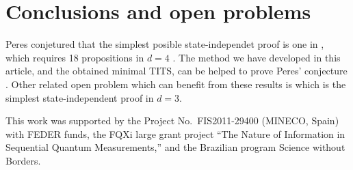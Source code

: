 \documentclass[%
  twocolumn,
 showpacs,
 showkeys,
 preprintnumbers,
 amsmath,amssymb,
 aps,
  pra,
  longbibliography,
 floatfix,
 ]{revtex4-1}
\begin{document}

\section{Conclusions and open problems}

Peres conjetured that the simplest posible state-independet proof is one in \cite{code17}, which requires 18 propositions in $d=4$ \cite{code19}. The method we have developed in this article, and the obtained minimal TITS, can be helped to prove Peres' conjecture \cite{code20}. Other related open problem which can benefit from these results is which is the simplest state-independent proof in $d=3$.


\begin{acknowledgments}
 This work was supported by the Project No.\ FIS2011-29400 (MINECO, Spain) with FEDER funds, the FQXi large grant project ``The Nature of Information in Sequential Quantum Measurements,'' and the Brazilian program Science without Borders.
\end{acknowledgments}


 
 
\end{document}
